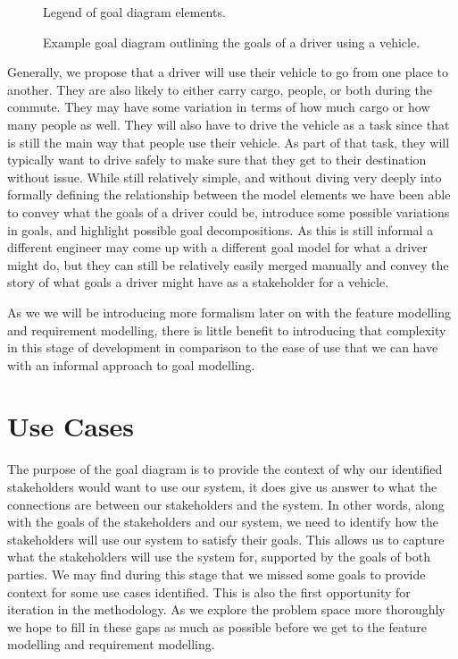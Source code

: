 \begin{figure}
	\centering
	
	\caption{Legend of goal diagram elements.}
	\label{fig:legend}
\end{figure}

\begin{figure}
	\centering
	
	\caption{Example goal diagram outlining the goals of a driver using a vehicle.}
	\label{fig:goal_diagram_example}
\end{figure}

Generally, we propose that a driver will use their vehicle to go from one place to another. They are also likely to either carry cargo, people, or both during the commute. They may have some variation in terms of how much cargo or how many people as well. They will also have to drive the vehicle as a task since that is still the main way that people use their vehicle. As part of that task, they will typically want to drive safely to make sure that they get to their destination without issue. While still relatively simple, and without diving very deeply into formally defining the relationship between the model elements we have been able to convey what the goals of a driver could be, introduce some possible variations in goals, and highlight possible goal decompositions. As this is still informal a different engineer may come up with a different goal model for what a driver might do, but they can still be relatively easily merged manually and convey the story of what goals a driver might have as a stakeholder for a vehicle.

As we we will be introducing more formalism later on with the feature modelling and requirement modelling, there is little benefit to introducing that complexity in this stage of development in comparison to the ease of use that we can have with an informal approach to goal modelling.

\section{Use Cases}

The purpose of the goal diagram is to provide the context of why our identified stakeholders would want to use our system, it does give us answer to what the connections are between our stakeholders and the system. In other words, along with the goals of the stakeholders and our system, we need to identify how the stakeholders will use our system to satisfy their goals. This allows us to capture what the stakeholders will use the system for, supported by the goals of both parties. We may find during this stage that we missed some goals to provide context for some use cases identified. This is also the first opportunity for iteration in the methodology. As we explore the problem space more thoroughly we hope to fill in these gaps as much as possible before we get to the feature modelling and requirement modelling.

